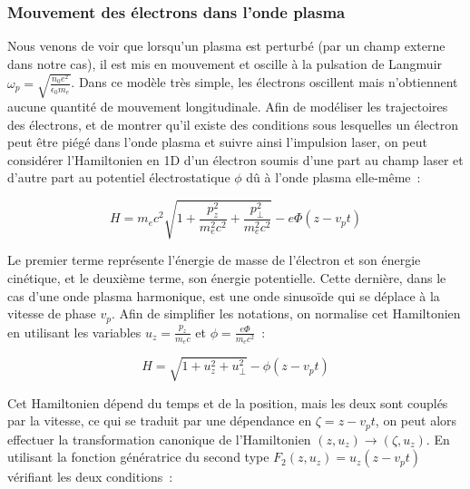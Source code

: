 \documentclass[a4paper]{book}
\begin{document}
\medskip

\noindent{}\hfill
    
\medskip

\subsubsection{Mouvement des électrons dans l'onde plasma}
Nous venons de voir que lorsqu'un plasma est perturbé (par un champ externe dans notre cas), il est mis en mouvement et oscille à la pulsation de Langmuir $\omega_p = \sqrt{\frac{n_0 e^2}{\epsilon_0 m_e}}$. Dans ce modèle très simple, les électrons oscillent mais n'obtiennent aucune quantité de mouvement longitudinale. Afin de modéliser les trajectoires des électrons, et de montrer qu'il existe des conditions sous lesquelles un électron peut être piégé dans l'onde plasma et suivre ainsi l'impulsion laser, on peut considérer l'Hamiltonien en 1D d'un électron soumis d'une part au champ laser et d'autre part au potentiel électrostatique $\phi$ dû à l'onde plasma elle-même~: 

\begin{equation*}
    H=m_ec^2\sqrt{1+\frac{p_z^2}{m_e^2c^2}+\frac{p_\perp^2}{m_e^2c^2}}-e\Phi(z-v_pt)
\end{equation*}

Le premier terme représente l'énergie de masse de l'électron et son énergie cinétique, et le deuxième terme, son énergie potentielle. Cette dernière, dans le cas d'une onde plasma harmonique, est une onde sinusoïde qui se déplace à la vitesse de phase $v_p$. Afin de simplifier les notations, on normalise cet Hamiltonien en utilisant les variables $u_z=\frac{p_z}{m_ec}$ et $\phi = \frac{e\Phi}{m_ec^2}$~:

\begin{equation}
    H=\sqrt{1+u_z^2+u_\perp^2}-\phi(z-v_pt)
\end{equation}

Cet Hamiltonien dépend du temps et de la position, mais les deux sont couplés par la vitesse, ce qui se traduit par une dépendance en $\zeta = z-v_pt$, on peut alors effectuer la transformation canonique de l'Hamiltonien $(z, u_z)\rightarrow(\zeta, u_z)$. En utilisant la fonction génératrice du second type $F_2(z, u_z)=u_z(z-v_pt)$ vérifiant les deux conditions~:
\end{document}
